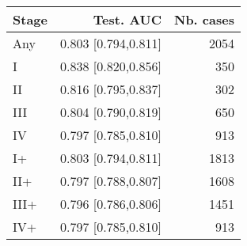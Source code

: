 \begin{table}[ht]
\centering
\begin{tabular}{lrr}
  \toprule
Stage & Test. AUC & Nb. cases \\ 
  \midrule
Any & 0.803 [0.794,0.811] & 2054 \\ 
   \addlinespace
I & 0.838 [0.820,0.856] & 350 \\ 
  II & 0.816 [0.795,0.837] & 302 \\ 
  III & 0.804 [0.790,0.819] & 650 \\ 
  IV & 0.797 [0.785,0.810] & 913 \\ 
   \addlinespace
I+ & 0.803 [0.794,0.811] & 1813 \\ 
  II+ & 0.797 [0.788,0.807] & 1608 \\ 
  III+ & 0.796 [0.786,0.806] & 1451 \\ 
  IV+ & 0.797 [0.785,0.810] & 913 \\ 
   \bottomrule
\end{tabular}
\end{table}
